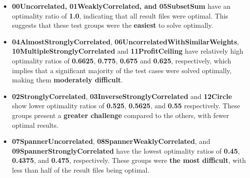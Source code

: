 \documentclass[english, a4paper,12pt]{article}
\begin{document}
\begin{itemize}
\item \textbf{00Uncorrelated, 01WeaklyCorrelated, and 05SubsetSum} have an optimality ratio of \textbf{1.0}, indicating that all result files were optimal. This suggests that these test groups were the \textbf{easiest} to solve optimally.\\
\item \textbf{04AlmostStronglyCorrelated}, \textbf{
06UncorrelatedWithSimilarWeights}, \textbf{10MultipleStronglyCorrelated} and \textbf{
11ProfitCeiling} have relatively high optimality ratios of \textbf{0.6625}, \textbf{0.775}, \textbf{0.675} and \textbf{0.625}, respectively, which implies that a significant majority of the test cases were solved optimally, making them \textbf{moderately difficult}.\\
\item 
\textbf{
02StronglyCorrelated}, \textbf{03InverseStronglyCorrelated} and \textbf{12Circle} show lower optimality ratios of \textbf{0.525}, \textbf{0.5625}, and \textbf{0.55} respectively. These groups present a \textbf{greater challenge} compared to the others, with fewer optimal results.\\
\item \textbf{
07SpannerUncorrelated},\textbf{ 08SpannerWeaklyCorrelated}, and \textbf{09SpannerStronglyCorrelated} have the lowest optimality ratios of \textbf{0.45}, \textbf{0.4375}, and \textbf{0.475}, respectively. These groups were \textbf{the most difficult}, with less than half of the result files being optimal.
\end{itemize}
\end{document}
